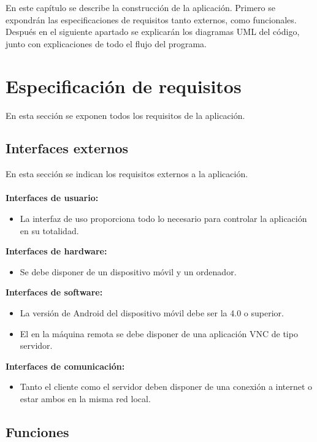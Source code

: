 En este capítulo se describe la construcción de la aplicación. Primero se expondrán las especificaciones de requisitos tanto externos, como funcionales. Después en el siguiente apartado se explicarán los diagramas UML del código, junto con explicaciones de todo el flujo del programa.

\section {Especificaci\'on de requisitos}

En esta sección se exponen todos los requisitos de la aplicación.

\subsection {Interfaces externos}

En esta sección se indican los requisitos externos a la aplicación.\\ \\
\textbf{Interfaces de usuario:}
\begin{itemize}
\item La interfaz de uso proporciona todo lo necesario para controlar la aplicación en su totalidad.\\
\end{itemize}
\textbf{Interfaces de hardware:}
\begin{itemize}
\item Se debe disponer de un dispositivo móvil y un ordenador.\\
\end{itemize}
\textbf{Interfaces de software:}
\begin{itemize}
\item La versión de Android del dispositivo móvil debe ser la 4.0 o superior.
\item El en la máquina remota se debe disponer de una aplicación VNC de tipo servidor.\\
\end{itemize}
\textbf{Interfaces de comunicación:}
\begin{itemize}
\item Tanto el cliente como el servidor deben disponer de una conexión a internet o estar ambos en la misma red local.\\
\end{itemize}
\subsection {Funciones}

